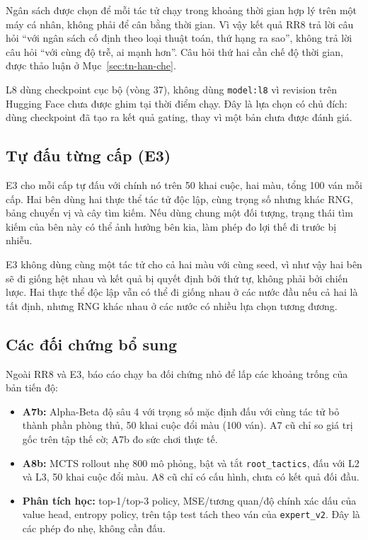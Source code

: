 Ngân sách được chọn để mỗi tác tử chạy trong khoảng thời gian hợp lý trên một máy cá nhân,
không phải để cân bằng thời gian. Vì vậy kết quả RR8 trả lời câu hỏi ``với ngân sách cố định
theo loại thuật toán, thứ hạng ra sao'', không trả lời câu hỏi ``với cùng độ trễ, ai mạnh hơn''.
Câu hỏi thứ hai cần chế độ thời gian, được thảo luận ở Mục~\ref{sec:tn-han-che}.

L8 dùng checkpoint cục bộ 
(vòng 37), không dùng \texttt{model:l8} vì revision trên Hugging Face chưa được ghim tại thời
điểm chạy. Đây là lựa chọn có chủ đích: dùng checkpoint đã tạo ra kết quả gating, thay vì một
bản chưa được đánh giá.

\subsection{Tự đấu từng cấp (E3)}
\label{sec:pp-e3}
E3 cho mỗi cấp tự đấu với chính nó trên 50 khai cuộc, hai màu, tổng 100 ván mỗi cấp. Hai bên
dùng hai thực thể tác tử độc lập, cùng trọng số nhưng khác RNG, bảng chuyển vị và cây tìm kiếm.
Nếu dùng chung một đối tượng, trạng thái tìm kiếm của bên này có thể ảnh hưởng bên kia, làm
phép đo lợi thế đi trước bị nhiễu.

E3 không dùng cùng một tác tử cho cả hai màu với cùng seed, vì như vậy hai bên sẽ đi giống hệt
nhau và kết quả bị quyết định bởi thứ tự, không phải bởi chiến lược. Hai thực thể độc lập vẫn
có thể đi giống nhau ở các nước đầu nếu cả hai là tất định, nhưng RNG khác nhau ở các nước có
nhiều lựa chọn tương đương.

\subsection{Các đối chứng bổ sung}
\label{sec:pp-doi-chung}
Ngoài RR8 và E3, báo cáo chạy ba đối chứng nhỏ để lấp các khoảng trống của bản tiến độ:
\begin{itemize}
  \item \textbf{A7b:} Alpha-Beta độ sâu 4 với trọng số mặc định đấu với cùng tác tử bỏ thành
        phần phòng thủ, 50 khai cuộc đổi màu (100 ván). A7 cũ chỉ so giá trị gốc trên tập thế
        cờ; A7b đo sức chơi thực tế.
  \item \textbf{A8b:} MCTS rollout nhẹ 800 mô phỏng, bật và tắt \texttt{root\_tactics}, đấu với
        L2 và L3, 50 khai cuộc đổi màu. A8 cũ chỉ có cấu hình, chưa có kết quả đối đầu.
  \item \textbf{Phân tích học:} top-1/top-3 policy, MSE/tương quan/độ chính xác dấu của value
        head, entropy policy, trên tập test tách theo ván của \texttt{expert\_v2}. Đây là các
        phép đo nhẹ, không cần đấu.
\end{itemize}

